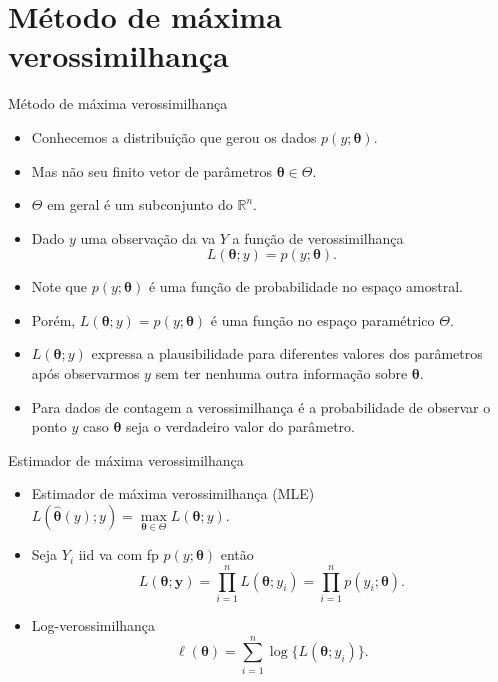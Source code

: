 \documentclass[10pt, aspectratio=169]{beamer}\usepackage[]{graphicx}\usepackage[]{color}
\begin{document}

\section{Método de máxima verossimilhança}
\label{Section3}




\begin{frame}{Método de máxima verossimilhança}
\begin{itemize}
  \item Conhecemos a distribuição que gerou os dados $p(y;\boldsymbol{\theta})$.
  \item Mas não seu finito vetor de parâmetros $\boldsymbol{\theta} \in \Theta$.
  \item $\Theta$ em geral é um subconjunto do $\mathbb{R}^n$.
  \item Dado $y$ uma observação da va $Y$ a função de verossimilhança 
  $$ L(\boldsymbol{\theta};y) = p(y;\boldsymbol{\theta}). $$
  \item Note que $p(y;\boldsymbol{\theta})$ é uma função de probabilidade
  no espaço amostral.
  \item Porém, $L(\boldsymbol{\theta};y) = p(y;\boldsymbol{\theta})$
  é uma função no espaço paramétrico $\Theta$.
  \item $L(\boldsymbol{\theta};y)$ expressa a plausibilidade para
  diferentes valores dos parâmetros após observarmos $y$ sem ter nenhuma
  outra informação sobre $\boldsymbol{\theta}$.
  \item Para dados de contagem a verossimilhança é a probabilidade de
  observar o ponto $y$ caso $\boldsymbol{\theta}$ seja o verdadeiro
  valor do parâmetro.
\end{itemize}
\end{frame}

\begin{frame}{Estimador de máxima verossimilhança}
\begin{itemize}
  \item Estimador de máxima verossimilhança (MLE) $L(\hat{\boldsymbol{\theta}}(y);y) = \underset{\boldsymbol{\theta}\in \Theta}\max L(\boldsymbol{\theta};y).$
  \item Seja $Y_i$ iid va com fp $p(y;\boldsymbol{\theta})$ então
  $$L(\boldsymbol{\theta};\boldsymbol{y}) = \prod_{i=1}^n L(\boldsymbol{\theta}; y_i) = \prod_{i=1}^n p(y_i; \boldsymbol{\theta}).$$
  \item Log-verossimilhança
  $$\ell(\boldsymbol{\theta})=\sum^n_{i=1} \log\{ L(\boldsymbol{\theta}; y_i) \}.$$
\end{itemize}
\end{frame}
\end{document}
